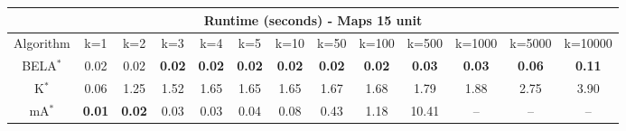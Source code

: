 \begin{tabular}{c|cccccccccccc}\toprule
\multicolumn{13}{c}{Runtime (seconds) - Maps 15 unit}\\ \midrule
Algorithm & k=1 & k=2 & k=3 & k=4 & k=5 & k=10 & k=50 & k=100 & k=500 & k=1000 & k=5000 & k=10000 \\ \midrule
BELA$^*$ & 0.02 & 0.02 & \textbf{0.02} & \textbf{0.02} & \textbf{0.02} & \textbf{0.02} & \textbf{0.02} & \textbf{0.02} & \textbf{0.03} & \textbf{0.03} & \textbf{0.06} & \textbf{0.11} \\
K$^*$ & 0.06 & 1.25 & 1.52 & 1.65 & 1.65 & 1.65 & 1.67 & 1.68 & 1.79 & 1.88 & 2.75 & 3.90 \\
mA$^*$ & \textbf{0.01} & \textbf{0.02} & 0.03 & 0.03 & 0.04 & 0.08 & 0.43 & 1.18 & 10.41 & -- & -- & -- \\ \bottomrule 
\end{tabular}
